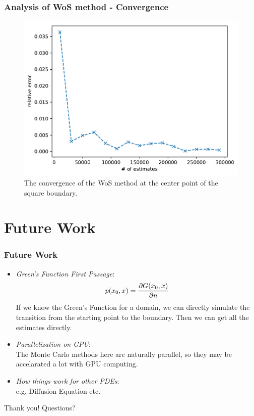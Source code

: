 \documentclass{beamer}
\begin{document}
\begin{frame}
\frametitle{Analysis of WoS method - Convergence}
\begin{figure}[htbp]
    \centering
    \includegraphics[width=.75\textwidth]{./figs/err_es}
    \caption{\label{fig:err_es} The convergence of the WoS method at the center point of the square boundary.}
\end{figure}
\end{frame}


\section{Future Work}

\begin{frame}
\frametitle{Future Work}
\begin{itemize}
    \item \emph{Green's Function First Passage}:
    \begin{equation*}
        p(x_0, x) = \pdv{G(x_0, x)}{n}
    \end{equation*}
    If we know the Green's Function for a domain, we can directly simulate the transition from the starting point to the boundary. Then we can get all the estimates directly.
    \item \emph{Parallelization on GPU}:\\
    The Monte Carlo methods here are naturally parallel, so they may be accelarated a lot with GPU computing.
    \item \emph{How things work for other PDEs}:\\
    e.g. Diffusion Equation etc.
\end{itemize}
\end{frame}


\begin{frame}
\Huge{\centerline{Thank you! Questions?}}
\end{frame}

\end{document}
